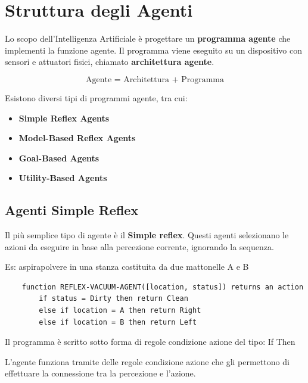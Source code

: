 \section{Struttura degli Agenti}

Lo scopo dell'Intelligenza Artificiale è progettare un
\textbf{programma agente} che implementi la funzione agente. Il programma viene eseguito su un dispositivo con sensori e attuatori fisici, chiamato \textbf{architettura agente}.

\begin{equation}
	\text{Agente = Architettura + Programma}
\end{equation}

Esistono diversi tipi di programmi agente, tra cui:

\begin{itemize}
	\item \textbf{Simple Reflex Agents}
	\item \textbf{Model-Based Reflex Agents}
	\item \textbf{Goal-Based Agents}
	\item \textbf{Utility-Based Agents}
\end{itemize}


\subsection{Agenti \foreignlanguage{english}{Simple Reflex}}

Il più semplice tipo di agente è il \foreignlanguage{english}{\textbf{Simple reflex}}. Questi agenti 
selezionano le azioni da eseguire in base alla percezione corrente, ignorando
la sequenza.

Es: aspirapolvere in una stanza costituita da due mattonelle A e B

\begin{lstlisting}
	function REFLEX-VACUUM-AGENT([location, status]) returns an action
		if status = Dirty then return Clean
		else if location = A then return Right
		else if location = B then return Left
\end{lstlisting}

Il programma è scritto sotto forma di regole condizione azione del tipo: \foreignlanguage{english}{If Then}


L'agente funziona tramite delle regole condizione azione che gli permettono di effettuare la connessione tra la 
percezione e l'azione.

